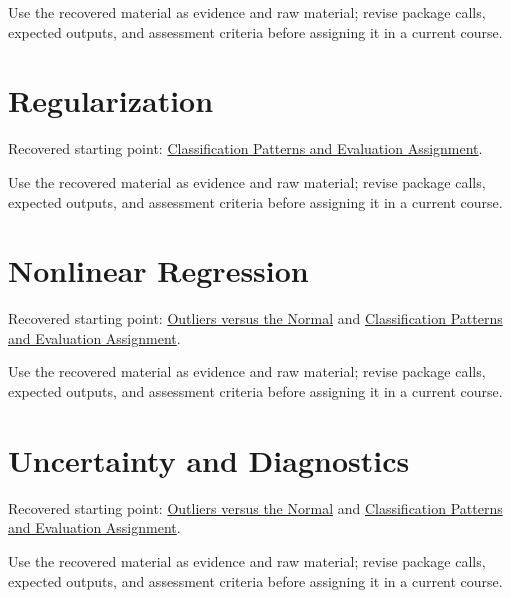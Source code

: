 \documentclass[
  letterpaper,
]{scrbook}
\begin{document}
Use the recovered material as evidence and raw material; revise package
calls, expected outputs, and assessment criteria before assigning it in
a current course.

\section*{Regularization}\label{sec-pr-09-regularization}


Recovered starting point:
\hyperref[sec-lab-classification-patterns-assignment]{Classification
Patterns and Evaluation Assignment}.

Use the recovered material as evidence and raw material; revise package
calls, expected outputs, and assessment criteria before assigning it in
a current course.

\section*{Nonlinear Regression}\label{sec-pr-09-nonlinear-regression}


Recovered starting point: \hyperref[sec-lab-outliers]{Outliers versus
the Normal} and
\hyperref[sec-lab-classification-patterns-assignment]{Classification
Patterns and Evaluation Assignment}.

Use the recovered material as evidence and raw material; revise package
calls, expected outputs, and assessment criteria before assigning it in
a current course.

\section*{Uncertainty and
Diagnostics}\label{sec-pr-09-uncertainty-and-diagnostics}


Recovered starting point: \hyperref[sec-lab-outliers]{Outliers versus
the Normal} and
\hyperref[sec-lab-classification-patterns-assignment]{Classification
Patterns and Evaluation Assignment}.

Use the recovered material as evidence and raw material; revise package
calls, expected outputs, and assessment criteria before assigning it in
a current course.
\end{document}
